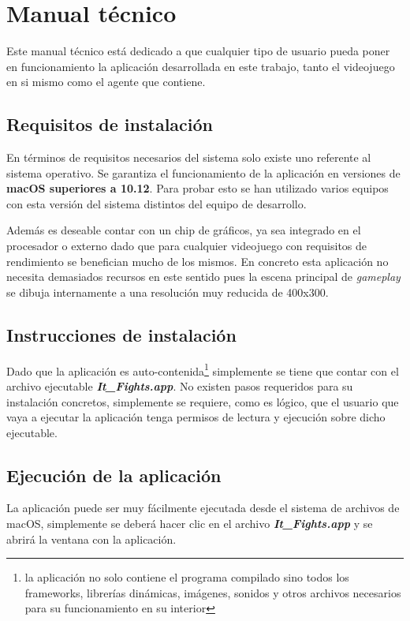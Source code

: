 \chapter{Manual técnico}


Este manual técnico está dedicado a que cualquier tipo de usuario pueda poner en funcionamiento la aplicación desarrollada en este trabajo, tanto el videojuego en si mismo como el agente que contiene. 

\section{Requisitos de instalación}

En términos de requisitos necesarios del sistema solo existe uno referente al sistema operativo. Se garantiza el funcionamiento de la aplicación en versiones de \textbf{macOS superiores a 10.12}. Para probar esto se han utilizado varios equipos con esta versión del sistema distintos del equipo de desarrollo.

\bigskip

Además es deseable contar con un chip de gráficos, ya sea integrado en el procesador o externo dado que para cualquier videojuego con requisitos de rendimiento se benefician mucho de los mismos. En concreto esta aplicación no necesita demasiados recursos en este sentido pues la escena principal de \textit{gameplay} se dibuja internamente a una resolución muy reducida de 400x300.

\section{Instrucciones de instalación}

Dado que la aplicación es auto-contenida\footnote{la aplicación no solo contiene el programa compilado sino todos los frameworks, librerías dinámicas, imágenes, sonidos y otros archivos necesarios para su funcionamiento en su interior} simplemente se tiene que contar con el archivo ejecutable \textit{\textbf{It\_Fights.app}}. No existen pasos requeridos para su instalación concretos, simplemente se requiere, como es lógico, que el usuario que vaya a ejecutar la aplicación tenga permisos de lectura y ejecución sobre dicho ejecutable.

\section{Ejecución de la aplicación}
\label{sec:ejecucion}
La aplicación puede ser muy fácilmente ejecutada desde el sistema de archivos de macOS, simplemente se deberá hacer clic en el archivo \textbf{\textit{It\_Fights.app}} y se abrirá la ventana con la aplicación.

